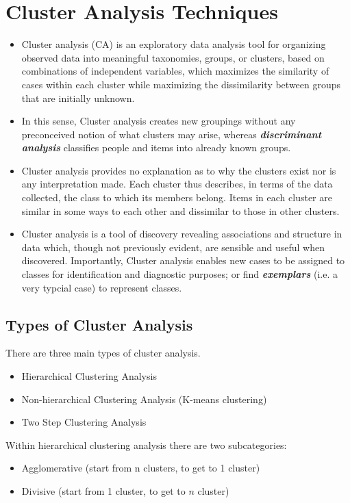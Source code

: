 \documentclass[a4paper,12pt]{article}
\begin{document}
\section{Cluster Analysis Techniques}
\begin{itemize}
\item Cluster analysis (CA) is an exploratory data analysis tool for organizing observed data into meaningful taxonomies, groups, or
clusters, based on combinations of independent variables, which maximizes the similarity of cases within
each cluster while maximizing the dissimilarity between groups that are initially unknown.

\item In this sense, Cluster analysis creates new groupings without any preconceived notion of what clusters
may arise, whereas \textit{\textbf{discriminant analysis}} classifies people and items into
already known groups.

\item Cluster analysis provides no explanation as to why the clusters exist nor is any
interpretation made. Each cluster thus describes, in terms of the data collected, the class to
which its members belong. Items in each cluster are similar in some ways to each other and
dissimilar to those in other clusters.

\item Cluster analysis is a tool of discovery revealing associations and structure in data which, though not previously
evident, are sensible and useful when discovered. Importantly, Cluster analysis enables new
cases to be assigned to classes for identification and diagnostic purposes; or find \textbf{\textit{exemplars}} (i.e. a very typcial case)
to represent classes.
\end{itemize}

\subsection{Types of Cluster Analysis}
There are three main types of cluster analysis.
\begin{itemize}
\item Hierarchical Clustering Analysis
\item Non-hierarchical Clustering Analysis (K-means clustering)
\item Two Step Clustering Analysis
\end{itemize}

\noindent Within hierarchical clustering analysis there are two subcategories: 
\begin{itemize}
\item Agglomerative (start from n clusters, to get to 1 cluster)
\item Divisive (start from 1 cluster, to get to $n$ cluster)
\end{itemize}
\end{document}
